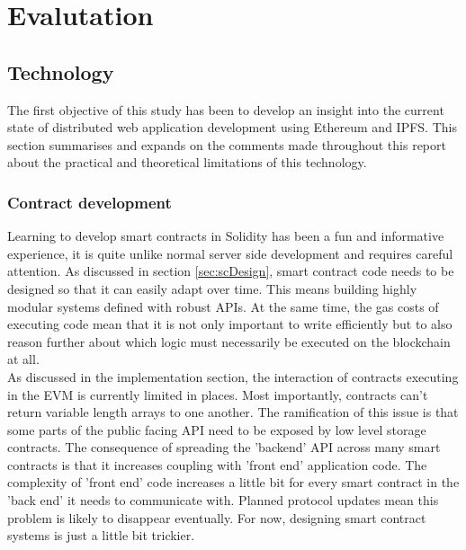 
\chapter{Evalutation} %
\label{Evaluation} %
\section{Technology}
The first objective of this study has been to develop an insight into the current state of distributed web application development using Ethereum and IPFS. This section summarises and expands on the comments made throughout this report about the practical and theoretical limitations of this technology. \\

\subsection{Contract development}
Learning to develop smart contracts in Solidity has been a fun and informative experience, it is quite unlike normal server side development and requires careful attention. As discussed in section \ref{sec:scDesign}, smart contract code needs to be designed so that it can easily adapt over time. This means building highly modular systems defined with robust APIs. At the same time, the gas costs of executing code mean that it is not only important to write efficiently but to also reason further about which logic must necessarily be executed on the blockchain at all.\\

As discussed in the implementation section, the interaction of contracts executing in the EVM is currently limited in places. Most importantly, contracts can't return variable length arrays to one another. The ramification of this issue is that some parts of the public facing API need to be exposed by low level storage contracts. The consequence of spreading the 'backend' API across many smart contracts is that it increases coupling with 'front end' application code. The complexity of 'front end' code increases a little bit for every smart contract in the 'back end' it needs to communicate with. Planned protocol updates mean this problem is likely to disappear eventually. For now, designing smart contract systems is just a little bit trickier.\\

